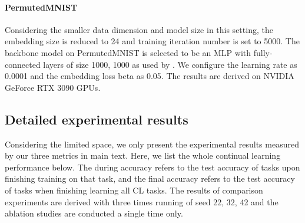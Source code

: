 \paragraph{PermutedMNIST} Considering the smaller data dimension and model size in this setting, the embedding size is reduced to 24 and training iteration number is set to 5000. The backbone model on PermutedMNIST is selected to be an MLP with fully-connected layers of size 1000, 1000 as used by \cite{van2019three}. We configure the learning rate as 0.0001 and the embedding loss beta as 0.05. The results are derived on NVIDIA GeForce RTX 3090 GPUs.

\subsection{Detailed experimental results}

Considering the limited space, we only present the experimental results measured by our three metrics in main text. Here, we list the whole continual learning performance below. The during accuracy refers to the test accuracy of tasks upon finishing training on that task, and the final accuracy refers to the test accuracy of tasks when finishing learning all CL tasks. The results of comparison experiments are derived with three times running of seed 22, 32, 42 and the ablation studies are conducted a single time only. 

